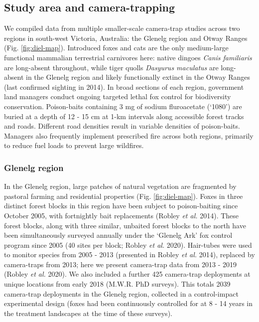 \documentclass[]{elsarticle} %
\begin{document}
\hypertarget{study-area-and-camera-trapping}{%
\subsection{Study area and camera-trapping}\label{study-area-and-camera-trapping}}

We compiled data from multiple smaller-scale camera-trap studies across two regions in south-west Victoria, Australia: the Glenelg region and Otway Ranges (Fig. \ref{fig:diel-map}). Introduced foxes and cats are the only medium-large functional mammalian terrestrial carnivores here: native dingoes \emph{Canis familiaris} are long-absent throughout, while tiger quolls \emph{Dasyurus maculatus} are long-absent in the Glenelg region and likely functionally extinct in the Otway Ranges (last confirmed sighting in 2014). In broad sections of each region, government land managers conduct ongoing targeted lethal fox control for biodiversity conservation. Poison-baits containing 3 mg of sodium fluroacetate (`1080') are buried at a depth of 12 - 15 cm at 1-km intervals along accessible forest tracks and roads. Different road densities result in variable densities of poison-baits. Managers also frequently implement prescribed fire across both regions, primarily to reduce fuel loads to prevent large wildfires.

\hypertarget{glenelg-region}{%
\subsubsection{Glenelg region}\label{glenelg-region}}

In the Glenelg region, large patches of natural vegetation are fragmented by pastoral farming and residential properties (Fig. \ref{fig:diel-map}). Foxes in three distinct forest blocks in this region have been subject to poison-baiting since October 2005, with fortnightly bait replacements (Robley \emph{et al.} 2014). These forest blocks, along with three similar, unbaited forest blocks to the north have been simultaneously surveyed annually under the `Glenelg Ark' fox control program since 2005 (40 sites per block; Robley \emph{et al.} 2020). Hair-tubes were used to monitor species from 2005 - 2013 (presented in Robley \emph{et al.} 2014), replaced by camera-traps from 2013; here we present camera-trap data from 2013 - 2019 (Robley \emph{et al.} 2020). We also included a further 425 camera-trap deployments at unique locations from early 2018 (M.W.R. PhD surveys). This totals 2039 camera-trap deployments in the Glenelg region, collected in a control-impact experimental design (foxes had been continuously controlled for at 8 - 14 years in the treatment landscapes at the time of these surveys).
\end{document}
